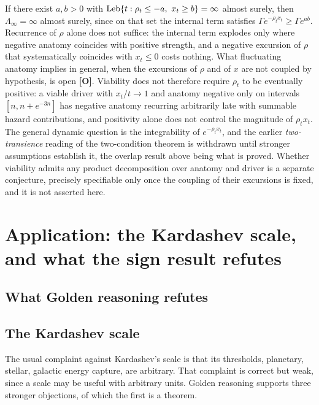 \begin{corollary}
\label{gr1:cor:recurrentanatomy}
If there exist $a,b>0$ with
$\operatorname{Leb}\{t:\rho_t\le-a,\ x_t\ge b\}=\infty$ almost surely, then
$\Lambda_\infty=\infty$ almost surely, since on that set the internal
term satisfies $\Gamma e^{-\rho_tx_t}\ge\Gamma e^{ab}$. Recurrence of
$\rho$ alone does not suffice: the internal term explodes only where
negative anatomy coincides with positive strength, and a negative
excursion of $\rho$ that systematically coincides with $x_t\le0$ costs
nothing. What fluctuating anatomy implies in general, when the
excursions of $\rho$ and of $x$ are not coupled by hypothesis, is open
\textbf{[O]}. Viability does not therefore require $\rho_t$ to be eventually positive: a viable driver with $x_t/t \to 1$ and anatomy negative only on intervals $[n, n + e^{-3n}]$ has negative anatomy recurring arbitrarily late with summable hazard contributions, and positivity alone does not control the magnitude of $\rho_t x_t$. The general dynamic question is the integrability of $e^{-\rho_t x_t}$, and the earlier \emph{two-transience} reading of the two-condition theorem is withdrawn until stronger assumptions establish it, the overlap result above being what is proved. Whether viability admits any product decomposition over anatomy and driver is a separate conjecture, precisely specifiable only once the coupling of their excursions is fixed, and it is not asserted here.
\end{corollary}

\section{Application: the Kardashev scale, and what the sign result refutes}\label{sec:refutes}

\subsection{What Golden reasoning refutes}\label{gr:sub:refutes}

\subsection{The Kardashev scale}\label{gr:subsub:kardashev}

The usual complaint against Kardashev's scale \cite{Kar64} is that its
thresholds, planetary, stellar, galactic energy capture, are
arbitrary. That complaint is correct but weak, since a scale may be
useful with arbitrary units. Golden reasoning supports three stronger
objections, of which the first is a theorem.

